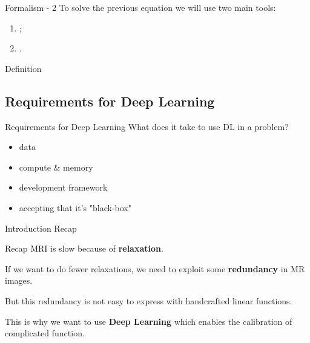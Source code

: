 \begin{frame}{Formalism - 2}
    To solve the previous equation we will use two main tools:
    
    \begin{enumerate}
        \item {};
        \item<2> .
    \end{enumerate}

    
        \begin{block}{Definition}
        \end{block}    
    
\end{frame}

\subsection{Requirements for Deep Learning}
\begin{frame}{Requirements for Deep Learning}
    What does it take to use DL in a problem?
    \begin{itemize}[<+->]
        \item data
        \item compute \& memory
        \item development framework
        \item accepting that it's "black-box"
    \end{itemize}
\end{frame}


\begin{frame}{Introduction Recap}
    \begin{block}{Recap}
        MRI is slow because of \textbf{relaxation}.
        
        \pause
        If we want to do fewer relaxations, we need to exploit some \textbf{redundancy} in MR images.
        
        \pause
        But this redundancy is not easy to express with handcrafted linear functions.
        
        \pause
        This is why we want to use \textbf{Deep Learning} which enables the calibration of complicated function.
    \end{block}
\end{frame}
